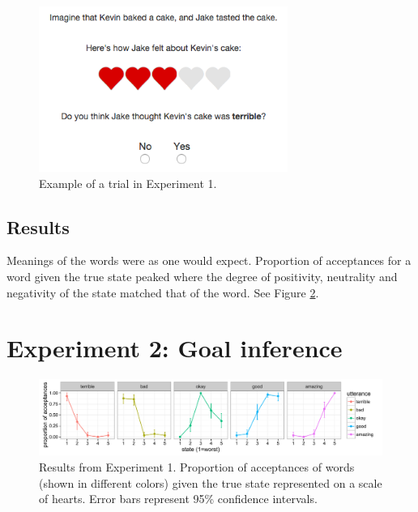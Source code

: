 \documentclass[10pt,letterpaper]{article}
\newcommand{\ndg}[1]{\textcolor{Green}{[ndg: #1]}}
\begin{document}
\begin{figure}
\begin{centering} 
\includegraphics[width=3.2in]{figures/example.png}
\caption{\label{fig:ex} Example of a trial in Experiment 1.}
\end{centering} 
\end{figure}

\subsection{Results}


Meanings of the words were as one would expect. 
Proportion of acceptances for a word given the true state peaked where the degree of positivity, neutrality and negativity of the state matched that of the word. 
See Figure \ref{fig:exp1}.

\section{Experiment 2: Goal inference}

\begin{figure}[t]
\begin{center} 
  \includegraphics[width=.9\textwidth]{figures/exp1.pdf}
  \caption{\label{fig:exp1} Results from Experiment 1. Proportion of acceptances of words (shown in different colors) given the true state represented on a scale of hearts. Error bars represent 95\% confidence intervals.}
  \end{center} 
\end{figure}
\end{document}
